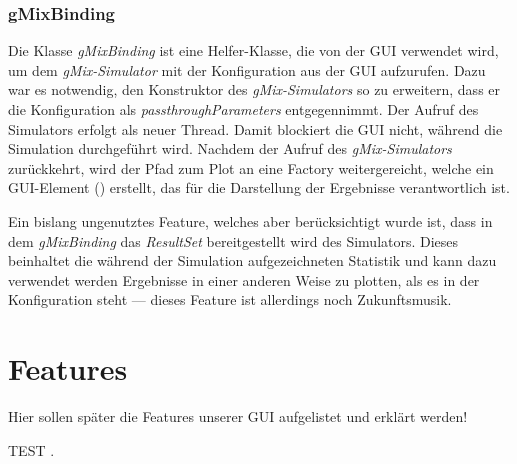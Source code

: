 \documentclass[a4paper, 11pt]{article} %
\begin{document}

\subsubsection{gMixBinding} %
\label{ssub:gmixbinding}
Die Klasse \emph{gMixBinding} ist eine Helfer-Klasse, die von der GUI verwendet wird, um dem \emph{gMix-Simulator} mit der Konfiguration aus der GUI aufzurufen. Dazu war es notwendig, den Konstruktor des \emph{gMix-Simulators} so zu erweitern, dass er die Konfiguration als \emph{passthroughParameters} entgegennimmt. Der Aufruf des Simulators erfolgt als neuer Thread. Damit blockiert die GUI nicht, während die Simulation durchgeführt wird. Nachdem der Aufruf des \emph{gMix-Simulators} zurückkehrt, wird der Pfad zum Plot an eine Factory weitergereicht, welche ein GUI-Element (\emph{}) erstellt, das für die Darstellung der Ergebnisse verantwortlich ist.

Ein bislang ungenutztes Feature, welches aber berücksichtigt wurde ist, dass in dem \emph{gMixBinding} das \emph{ResultSet} bereitgestellt wird des Simulators. Dieses beinhaltet die während der Simulation aufgezeichneten Statistik und kann dazu verwendet werden Ergebnisse in einer anderen Weise zu plotten, als es in der Konfiguration steht --- dieses Feature ist allerdings noch Zukunftsmusik. 

\section{Features} %
\label{sec:features}
Hier sollen später die Features unserer GUI aufgelistet und erklärt werden!

TEST \cite{dummy:svs}.





\end{document}
